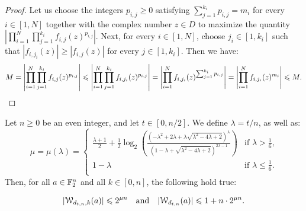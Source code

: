 \documentclass[11pt]{llncs}
\begin{document}
\begin{proof}
    Let us choose the integers $p_{i,j}\geq 0$ satisfying $\sum_{j=1}^{k_i}p_{i,j}=m_i$ for every $i\in[1,N]$ together with the complex number $z\in D$ to maximize the quantity $\left|\prod_{i=1}^N\prod_{j=1}^{k_i}f_{i,j}(z)^{p_{i,j}}\right|$. Next, for every $i\in[1,N]$, choose $j_i\in[1,k_i]$ such that $|f_{i,j_i}(z)|\geq|f_{i,j}(z)|$ for every $j\in[1,k_i]$. Then we have:
    \[
        M=\left|\prod_{i=1}^N\prod_{j=1}^{k_i}f_{i,j}(z)^{p_{i,j}}\right|\leq\left|\prod_{i=1}^N\prod_{j=1}^{k_i}f_{i,j_i}(z)^{p_{i,j}}\right|=\left|\prod_{i=1}^Nf_{i,j_i}(z)^{\sum_{j=1}^{k_i}p_{i,j}}\right|=\left|\prod_{i=1}^Nf_{i,j_i}(z)^{m_i}\right|\leq M.\qedhere
    \]
\end{proof}

\begin{theorem}\label{theorem:bound_D_nka_generalized}
    Let $n\geq 0$ be an even integer, and let $t\in[0,n/2]$. We define $\lambda=t/n$, as well as:
    \[
        \mu=\mu(\lambda)=
        \begin{cases}
            \frac{\lambda+1}{2}+\frac12\log_2\left(\frac{\left(-\lambda^2+2\lambda+\lambda\sqrt{\lambda^2-4\lambda+2}\right)^\lambda}{\left(1-\lambda+\sqrt{\lambda^2-4\lambda+2}\right)^{2\lambda-1}}\right)&\text{if $\lambda>\frac 16$,}\\
            1-\lambda&\text{if $\lambda\leq\frac 16$.}\\
        \end{cases}
    \]
    Then, for all $a\in\F_2^n$ and all $k\in[0,n]$, the following hold true:

    \[
        |\wtk{d_{t,n}}{k}(a)|\leq 2^{\mu n}\quad \text{and} \quad  |\wt{d_{t,n}}(a)|\leq 1+n\cdot 2^{\mu n}.
    \]
\end{theorem}
\end{document}

